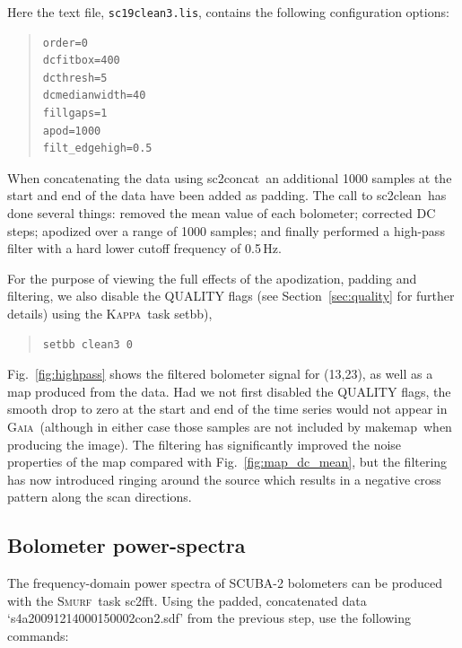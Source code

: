 \documentclass[twoside,11pt]{article}
\newcommand{\xref}[3]{#1}
\newcommand{\xlabel}[1]{}
\renewcommand{\_}{\texttt{\symbol{95}}}
\newenvironment{myquote}{\begin{quote}\begin{small}}{\end{small}\end{quote}}
\newcommand{\Kappa}{\xref{\textsc{Kappa}}{sun95}{}}
\newcommand{\gaia}{\xref{\textsc{Gaia}}{sun214}{}}
\newcommand{\smurf}{\xref{\textsc{Smurf}}{sun258}{}}
\newcommand{\task}[1]{\textsf{#1}}
\newcommand{\concat}{\xref{\task{sc2concat}}{sun258}{SC2CONCAT}}
\newcommand{\fft}{\xref{\task{sc2fft}}{sun258}{SC2FFT}}
\newcommand{\clean}{\xref{\task{sc2clean}}{sun258}{SC2CLEAN}}
\newcommand{\makemap}{\xref{\task{makemap}}{sun258}{MAKEMAP}}
\newcommand{\setbb}{\xref{\task{setbb}}{sun95}{SETBB}}
\begin{document}
Here the text file, \texttt{sc19\_clean3.lis}, contains the following
configuration options:

\begin{myquote}
\begin{verbatim}
order=0
dcfitbox=400
dcthresh=5
dcmedianwidth=40
fillgaps=1
apod=1000
filt_edgehigh=0.5
\end{verbatim}
\end{myquote}

When concatenating the data using \concat\ an additional 1000 samples
at the start and end of the data have been added as padding. The call
to \clean\ has done several things: removed the mean value of each
bolometer; corrected DC steps; apodized over a range of 1000 samples;
and finally performed a high-pass filter with a hard lower cutoff
frequency of 0.5\,Hz.

For the purpose of viewing the full effects of the apodization,
padding and filtering, we also disable the QUALITY flags (see
Section~\ref{sec:quality} for further details) using the \Kappa\ task
\setbb),

\begin{myquote}
\begin{verbatim}
setbb clean3 0
\end{verbatim}
\end{myquote}

Fig.~\ref{fig:highpass} shows the filtered bolometer signal for
(13,23), as well as a map produced from the data. Had we not first
disabled the QUALITY flags, the smooth drop to zero at the start and
end of the time series would not appear in \gaia\ (although in either
case those samples are not included by \makemap\ when producing the
image).  The filtering has significantly improved the noise properties
of the map compared with Fig.~\ref{fig:map_dc_mean}, but the filtering
has now introduced ringing around the source which results in a
negative cross pattern along the scan directions.

\subsection{\xlabel{pspec}Bolometer power-spectra}

The frequency-domain power spectra of SCUBA-2 bolometers can be
produced with the \smurf\ task \fft. Using the padded, concatenated
data `s4a20091214\_00015\_0002\_con2.sdf' from the previous step, use the
following commands:
\end{document}
